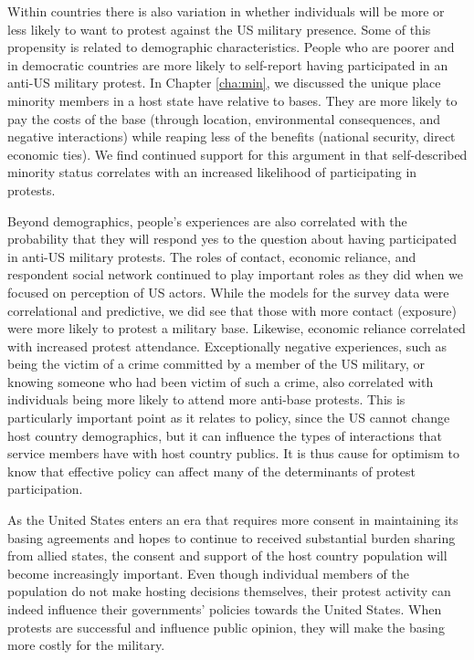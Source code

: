Within countries there is also variation in whether individuals will be more or less likely to want to protest against the US military presence. Some of this propensity is related to demographic characteristics. People who are poorer and in democratic countries are more likely to self-report having participated in an anti-US military protest. In Chapter \ref{cha:min}, we discussed the unique place minority members in a host state have relative to bases. They are more likely to pay the costs of the base (through location, environmental consequences, and negative interactions) while reaping less of the benefits (national security, direct economic ties). We find continued support for this argument in that self-described minority status correlates with an increased likelihood of participating in protests.


Beyond demographics, people's experiences are also correlated with the probability that they will respond yes to the question about having participated in anti-US military protests. The roles of contact, economic reliance, and respondent social network continued to play important roles as they did when we focused on perception of US actors. While the models for the survey data were correlational and predictive, we did see that those with more contact (exposure) were more likely to protest a military base. Likewise, economic reliance correlated with increased protest attendance. Exceptionally negative experiences, such as being the victim of a crime committed by a member of the US military, or knowing someone who had been victim of such a crime, also correlated with individuals being more likely to attend more anti-base protests. This is particularly important point as it relates to policy, since the US cannot change host country demographics, but it can influence the types of interactions that service members have with host country publics. It is thus cause for optimism to know that effective policy can affect many of the determinants of protest participation.

As the United States enters an era that requires more consent in maintaining its basing agreements and hopes to continue to received substantial burden sharing from allied states, the consent and support of the host country population will become increasingly important. Even though individual members of the population do not make hosting decisions themselves, their protest activity can indeed influence their governments' policies towards the United States. When protests are successful and influence public opinion, they will make the basing more costly for the military. 





